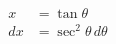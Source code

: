 \documentclass[preview]{standalone}
\begin{document}
\begin{align*}
x&=\tan\theta \\ dx&=\sec^2\theta \, d\theta
\end{align*}
\end{document}
